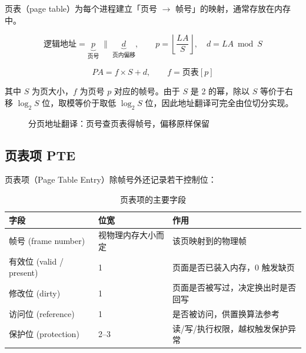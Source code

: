 页表（page table）为每个进程建立「页号 $\to$ 帧号」的映射，通常存放在内存中。

\begin{equation}
    \text{逻辑地址} = \underbrace{p}_{\text{页号}} \;\|\; \underbrace{d}_{\text{页内偏移}}, \qquad
    p = \left\lfloor \frac{LA}{S} \right\rfloor,\quad d = LA \bmod S
\end{equation}

\begin{equation}
    PA = f \times S + d, \qquad f = \text{页表}[p]
\end{equation}

其中 $S$ 为页大小，$f$ 为页号 $p$ 对应的帧号。由于 $S$ 是 2 的幂，除以 $S$ 等价于右移 $\log_2 S$ 位，取模等价于取低 $\log_2 S$ 位，因此地址翻译可完全由位切分实现。

\begin{figure}[H]
\centering
{}
\caption{分页地址翻译：页号查页表得帧号，偏移原样保留}
\end{figure}

\subsection{页表项 PTE}

页表项（Page Table Entry）除帧号外还记录若干控制位：

\begin{table}[H]
\centering
\caption{页表项的主要字段}
\begin{tabulary}{\textwidth}{LLL}
\toprule
字段 & 位宽 & 作用 \\
\midrule
帧号 (frame number) & 视物理内存大小而定 & 该页映射到的物理帧 \\
有效位 (valid / present) & 1 & 页面是否已装入内存，0 触发缺页 \\
修改位 (dirty) & 1 & 页面是否被写过，决定换出时是否回写 \\
访问位 (reference) & 1 & 是否被访问，供置换算法参考 \\
保护位 (protection) & 2--3 & 读/写/执行权限，越权触发保护异常 \\
\bottomrule
\end{tabulary}
\end{table}


